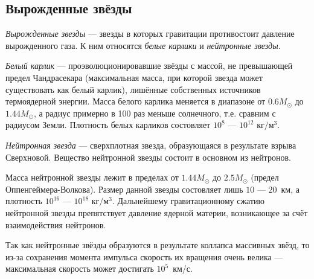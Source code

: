 \subsection{Вырожденные звёзды}
\textit{Вырожденные звезды} --- звезды в которых гравитации противостоит давление вырожденного газа. К ним относятся \textit{белые карлики} и \textit{нейтронные звезды}. 

\textit{Белый карлик} --- проэволюционировавшие звёзды с массой, не превышающей предел Чандрасекара (максимальная масса, при которой звезда может существовать как белый карлик), лишённые собственных источников термоядерной энергии. Масса белого карлика меняется в диапазоне от $0.6M_{\odot}$ до $1.44 M_{\odot}$, а радиус  примерно в 100 раз меньше солнечного, т.е. сравним с радиусом Земли. Плотность белых карликов состовляет $10^8$ --- $10^{12}$ $\text{кг}/\text{м}^3$.

\textit{Нейтронная звезда} --- сверхплотная звезда, образующаяся в результате взрыва Сверхновой. Вещество нейтронной звезды состоит в основном из нейтронов.

Масса нейтронной звезды лежит в пределах от $1.44M_{\odot}$ до $2.5M_{\odot}$ (предел Оппенгеймера-Волкова). Размер данной звезды состовляет лишь $10$ --- $20$~км, а плотность $10^{16}$ --- $10^{18}$ $\text{кг}/\text{м}^3$.  Дальнейшему гравитационному сжатию нейтронной звезды препятствует давление ядерной материи, возникающее за счёт взаимодействия нейтронов.

Так как нейтронные звёзды образуются в результате  коллапса массивных звёзд, то из-за сохранения момента импульса скорость их вращения очень велика --- максимальная скорость может достигать $10^5$~км/с.